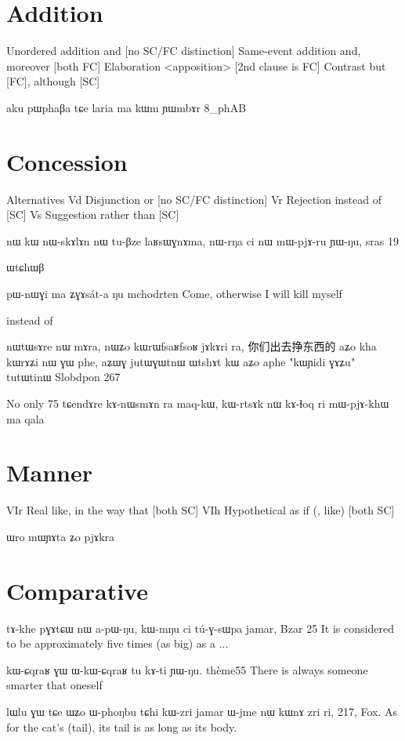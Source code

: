 \documentclass[oldfontcommands,oneside,a4paper,11pt]{memoir}
\newcommand{\wav}[1]{}%
\begin{document}
\section{Addition}
Unordered addition and [no SC/FC distinction]
 Same-event addition and, moreover [both FC]
 Elaboration <apposition> [2nd clause is FC]
Contrast but [FC], although [SC]



aku pɯphaβa tɕe laria ma kɯm ɲɯmbɤr
8_phAB
\section{Concession}
Alternatives
Vd Disjunction or [no SC/FC distinction]
Vr Rejection instead of [SC]
Vs Suggestion rather than [SC]


nɯ kɯ nɯ-skɤlɤn nɯ tu-βze laʁsɯɣnɤma, nɯ-rŋa ci nɯ mɯ-pjɤ-ru ɲɯ-ŋu,
sras 19



ɯtɕhɯβ



pɯ-nɯɣi	ma	ʑɣɤsát-a	ŋu
mchodrten
Come, otherwise I will kill myself


instead of

nɯtɯsɤre nɯ mɤra, nɯʑo kɯrɯfsaʁfsoʁ jɤkɤri ra, 你们出去挣东西的
aʑo kha kɯrɤʑi nɯ ɣɯ phe, aʑɯɣ jutɯɣɯtnɯ ɯtshɤt kɯ aʑo aphe "kɯɲidi ɣɤʑu" tutɯtinɯ
Slobdpon 267



No only
75	tɕendɤre	kɤ-nɯsmɤn	ra	maq-kɯ,	kɯ-rtsɤk	nɯ	kɤ-ɬoq	ri	mɯ-pjɤ-khɯ	ma
qala


\section{Manner}
VIr Real like, in the way that [both SC]
VIh Hypothetical as if (, like) [both SC]


ɯro mɯɲɤta ʑo pjɤkra

\section{Comparative}
tɤ-khe	pɣɤtɕɯ	nɯ	a-pɯ-ŋu,	kɯ-mŋu	ci	tú-ɣ-sɯpa	jamar,
Bzar 25 It is considered to be approximately five times (as big) as a ...

 
kɯ-ɕqraʁ ɣɯ ɯ-kɯ-ɕqraʁ tu kɤ-ti ɲɯ-ŋu.
thème55
There is always someone smarter that oneself


lɯlu ɣɯ tɕe ɯʑo ɯ-phoŋbu tɕhi kɯ-zri jamar ɯ-jme nɯ kɯnɤ zri ri,
217, \wav{x-27-qartshaz} Fox.
As for the cat's (tail), its tail is as long as its body.
\end{document}
